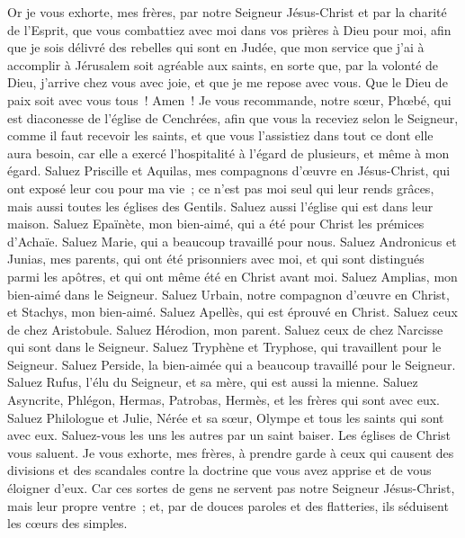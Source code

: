 \begin{multicols}{2}
Or je vous exhorte, mes frères, par notre Seigneur Jésus-Christ et par la charité de l'Esprit, que vous combattiez avec moi dans vos prières à Dieu pour moi,
afin que je sois délivré des rebelles qui sont en Judée, que mon service que j'ai à accomplir à Jérusalem soit agréable aux saints,
en sorte que, par la volonté de Dieu, j'arrive chez vous avec joie, et que je me repose avec vous.
Que le Dieu de paix soit avec vous tous~! Amen~!
\VerseOne{}Je vous recommande, notre sœur, Phœbé, qui est diaconesse de l'église de Cenchrées,
afin que vous la receviez selon le Seigneur, comme il faut recevoir les saints, et que vous l'assistiez dans tout ce dont elle aura besoin, car elle a exercé l'hospitalité à l'égard de plusieurs, et même à mon égard.
Saluez Priscille et Aquilas, mes compagnons d'œuvre en Jésus-Christ,
qui ont exposé leur cou pour ma vie~; ce n'est pas moi seul qui leur rends grâces, mais aussi toutes les églises des Gentils.
Saluez aussi l'église qui est dans leur maison. Saluez Epaïnète, mon bien-aimé, qui a été pour Christ les prémices d'Achaïe.
Saluez Marie, qui a beaucoup travaillé pour nous.
Saluez Andronicus et Junias, mes parents, qui ont été prisonniers avec moi, et qui sont distingués parmi les apôtres, et qui ont même été en Christ avant moi.
Saluez Amplias, mon bien-aimé dans le Seigneur.
Saluez Urbain, notre compagnon d'œuvre en Christ, et Stachys, mon bien-aimé.
Saluez Apellès, qui est éprouvé en Christ. Saluez ceux de chez Aristobule.
Saluez Hérodion, mon parent. Saluez ceux de chez Narcisse qui sont dans le Seigneur.
Saluez Tryphène et Tryphose, qui travaillent pour le Seigneur. Saluez Perside, la bien-aimée qui a beaucoup travaillé pour le Seigneur.
Saluez Rufus, l'élu du Seigneur, et sa mère, qui est aussi la mienne.
Saluez Asyncrite, Phlégon, Hermas, Patrobas, Hermès, et les frères qui sont avec eux.
Saluez Philologue et Julie, Nérée et sa sœur, Olympe et tous les saints qui sont avec eux.
Saluez-vous les uns les autres par un saint baiser. Les églises de Christ vous saluent.
Je vous exhorte, mes frères, à prendre garde à ceux qui causent des divisions et des scandales contre la doctrine que vous avez apprise et de vous éloigner d'eux.
Car ces sortes de gens ne servent pas notre Seigneur Jésus-Christ, mais leur propre ventre~; et, par de douces paroles et des flatteries, ils séduisent les cœurs des simples.

\end{multicols}
